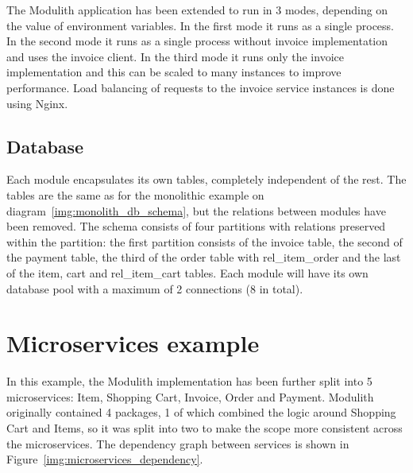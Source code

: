 The Modulith application has been extended to run in 3 modes, depending on the value of environment variables. In the first mode it runs as a single process. In the second mode it runs as a single process without invoice implementation and uses the invoice client. In the third mode it runs only the invoice implementation and this can be scaled to many instances to improve performance. Load balancing of requests to the invoice service instances is done using Nginx.

%     

%     

\subsection{Database}
Each module encapsulates its own tables, completely independent of the rest. The tables are the same as for the monolithic example on diagram~\ref{img:monolith_db_schema}, but the relations between modules have been removed. The schema consists of four partitions with relations preserved within the partition: the first partition consists of the invoice table, the second of the payment table, the third of the order table with rel\_item\_order and the last of the item, cart and rel\_item\_cart tables. Each module will have its own database pool with a maximum of 2 connections (8 in total).


\section{Microservices example}
In this example, the Modulith implementation has been further split into 5 microservices: Item, Shopping Cart, Invoice, Order and Payment. Modulith originally contained 4 packages, 1 of which combined the logic around Shopping Cart and Items, so it was split into two to make the scope more consistent across the microservices. The dependency graph between services is shown in Figure~\ref{img:microservices_dependency}.

